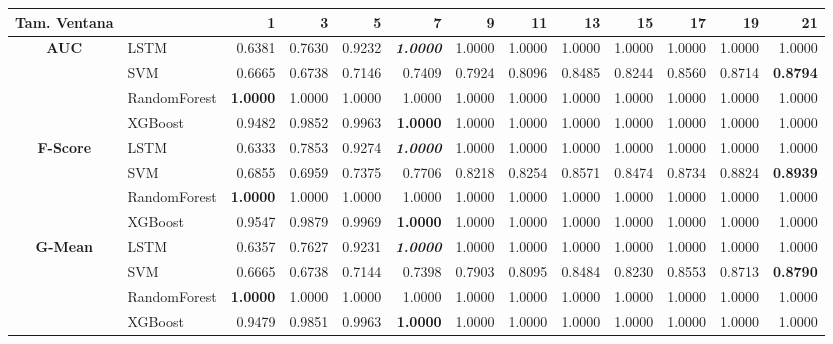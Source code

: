 \begin{table}[H]
	\centering
	\begin{adjustbox}{max width=12cm}
		\begin{tabular}{|c|l|r|r|r|r|r|r|r|r|r|r|r|}
			\hline
			\textbf{Tam. Ventana}&         &      1  &      3  &      5  &      7  &      9  &      11 &      13 &      15 &      17 &      19 &      21 \\
			\hline
			\textbf{AUC} &  LSTM &  0.6381 &  0.7630 &  0.9232 & \textit{ \textbf{  1.0000 } } &  1.0000 &  1.0000 &  1.0000 &  1.0000 &  1.0000 &  1.0000 &  1.0000 \\
			&  SVM &  0.6665 &  0.6738 &  0.7146 &  0.7409 &  0.7924 &  0.8096 &  0.8485 &  0.8244 &  0.8560 &  0.8714 & \textbf{  0.8794 } \\
			&  RandomForest & \textbf{  1.0000 } &  1.0000 &  1.0000 &  1.0000 &  1.0000 &  1.0000 &  1.0000 &  1.0000 &  1.0000 &  1.0000 &  1.0000 \\
			&  XGBoost &  0.9482 &  0.9852 &  0.9963 & \textbf{  1.0000 } &  1.0000 &  1.0000 &  1.0000 &  1.0000 &  1.0000 &  1.0000 &  1.0000 \\
			\hline
			\textbf{F-Score} &  LSTM &  0.6333 &  0.7853 &  0.9274 & \textit{ \textbf{  1.0000 } } &  1.0000 &  1.0000 &  1.0000 &  1.0000 &  1.0000 &  1.0000 &  1.0000 \\
			&  SVM &  0.6855 &  0.6959 &  0.7375 &  0.7706 &  0.8218 &  0.8254 &  0.8571 &  0.8474 &  0.8734 &  0.8824 & \textbf{  0.8939 } \\
			&  RandomForest & \textbf{  1.0000 } &  1.0000 &  1.0000 &  1.0000 &  1.0000 &  1.0000 &  1.0000 &  1.0000 &  1.0000 &  1.0000 &  1.0000 \\
			&  XGBoost &  0.9547 &  0.9879 &  0.9969 & \textbf{  1.0000 } &  1.0000 &  1.0000 &  1.0000 &  1.0000 &  1.0000 &  1.0000 &  1.0000 \\
			\hline
			\textbf{G-Mean} &  LSTM &  0.6357 &  0.7627 &  0.9231 & \textit{ \textbf{  1.0000 } } &  1.0000 &  1.0000 &  1.0000 &  1.0000 &  1.0000 &  1.0000 &  1.0000 \\
			&  SVM &  0.6665 &  0.6738 &  0.7144 &  0.7398 &  0.7903 &  0.8095 &  0.8484 &  0.8230 &  0.8553 &  0.8713 & \textbf{  0.8790 } \\
			&  RandomForest & \textbf{  1.0000 } &  1.0000 &  1.0000 &  1.0000 &  1.0000 &  1.0000 &  1.0000 &  1.0000 &  1.0000 &  1.0000 &  1.0000 \\
			&  XGBoost &  0.9479 &  0.9851 &  0.9963 & \textbf{  1.0000 } &  1.0000 &  1.0000 &  1.0000 &  1.0000 &  1.0000 &  1.0000 &  1.0000 \\

\end{tabular}
\end{adjustbox}
\end{table}
